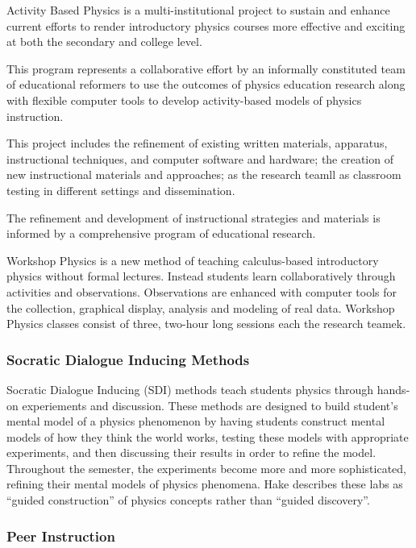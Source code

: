 Activity Based Physics is a multi-institutional project to sustain and enhance current efforts to render introductory physics courses more effective and exciting at both the secondary and college level.

This program represents a collaborative effort by an informally constituted team of educational reformers to use the outcomes of physics education research along with flexible computer tools to develop activity-based models of physics instruction.

This project includes the refinement of existing written materials, apparatus, instructional techniques, and computer software and hardware; the creation of new instructional materials and approaches; as the research teamll as classroom testing in different settings and dissemination.

The refinement and development of instructional strategies and materials is informed by a comprehensive program of educational research.

Workshop Physics is a new method of teaching calculus-based introductory physics without formal lectures. Instead students learn collaboratively through activities and observations. Observations are enhanced with computer tools for the collection, graphical display, analysis and modeling of real data. Workshop Physics classes consist of three, two-hour long sessions each the research teamek.

\subsubsection{Socratic Dialogue Inducing Methods}

Socratic Dialogue Inducing (SDI) methods teach students physics through hands-on experiements and discussion. These methods are designed to build student's mental model of a physics phenomenon by having students construct mental models of how they think the world works, testing these models with appropriate experiments, and then discussing their results in order to refine the model. Throughout the semester, the experiments become more and more sophisticated, refining their mental models of physics phenomena. Hake describes these labs as ``guided construction'' of physics concepts rather than ``guided discovery''\cite{hake1992}.

\subsubsection{Peer Instruction}

